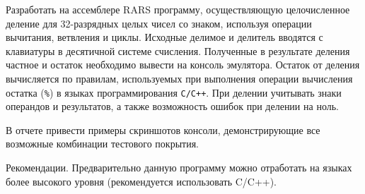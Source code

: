 Разработать на ассемблере RARS программу, осуществляющую целочисленное деление для 32-разрядных целых чисел со знаком, используя операции вычитания, ветвления и циклы. Исходные делимое и делитель вводятся с клавиатуры в десятичной системе счисления. Полученные в результате деления частное и остаток необходимо вывести на консоль эмулятора. Остаток от деления вычисляется по правилам, используемых при выполнения операции вычисления остатка (\verb|%|) в языках программирования \verb|C/C++|. При делении учитывать знаки операндов и результатов, а также возможность ошибок при делении на ноль.

В отчете привести примеры скриншотов консоли, демонстрирующие все возможные комбинации тестового покрытия.

Рекомендации. Предварительно данную программу можно отработать на языках более высокого уровня (рекомендуется использовать C/C++).


